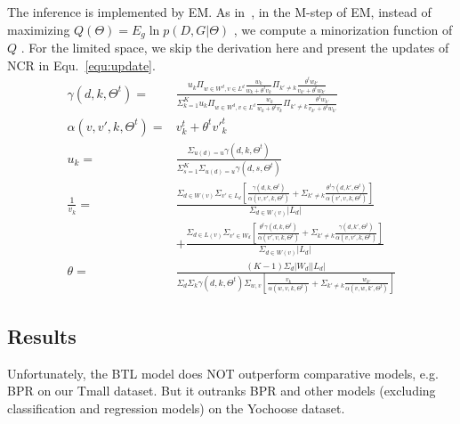 \documentclass[11pt]{report}
\begin{document}
The inference is implemented by EM. As in~\cite{Hunter2004MM}, in the M-step of EM, instead of maximizing $Q(\Theta)=E_g \ln p(D,G|\Theta) $ , we compute a minorization function of $Q$ . For the limited space, we skip the derivation here and present the updates of NCR in Equ.~\ref{equ:update}. 
\begin{align}\label{equ:update}
\gamma(d,k,\Theta^t) =&\frac{u_k \Pi_{w \in W^d, v\in L^d} \frac{w_k}{w_k+\theta^t v_k}\Pi_{k'\neq k}\frac{\theta^t w_{k'}}{v_{k'}+\theta^t w_{k'}}}{\Sigma_{k=1}^K u_k \Pi_{w \in W^d, v\in L^d} \frac{w_k}{w_k+\theta^t v_k}\Pi_{k'\neq k}\frac{\theta^t w_{k'}}{v_{k'}+\theta^t w_{k'}}}\\\nonumber
\alpha(v,v',k,\Theta^t)=&v_k^t + \theta^t {v'}_k^t\\\nonumber
u_k = & \frac{\Sigma_{u(d)=u}\gamma(d,k,\Theta^t)}{\Sigma_{s=1}^K \Sigma_{u(d)=u}\gamma(d,s,\Theta^t)} \\\nonumber
\frac{1}{v_k}= &\frac{\Sigma_{d\in W(v)}\Sigma_{v'\in L_d} [\frac{\gamma(d,k,\Theta^t)}{ \alpha(v,v',k,\Theta^t)} +\Sigma_{k'\neq k}\frac{\theta^t\gamma(d,k',\Theta^t)}{\alpha(v',v,k,\Theta^t)}]}{\Sigma_{d\in W(v)}|L_d|}\\\nonumber
 & + \frac{\Sigma_{d\in L(v)}\Sigma_{v'\in W_d} [\frac{\theta^t \gamma(d,k,\Theta^t)}{\alpha(v',v,k,\Theta^t)}+\Sigma_{k'\neq k} \frac{\gamma(d,k',\Theta^t)}{\alpha(v,v',k,\Theta^t)}] }{\Sigma_{d\in W(v)}|L_d|}\\\nonumber
\theta = & \frac{(K-1)\Sigma_d |W_d| |L_d|}{\Sigma_d \Sigma_k \gamma(d,k,\Theta^t)\Sigma_{w,v} [\frac{v_k}{\alpha(w,v,k,\Theta^t)}+\Sigma_{k'\neq k} \frac{w_{k'}}{\alpha(v,w,k',\Theta^t)}]}
\end{align}

 

\subsection{Results}
Unfortunately, the BTL model does NOT outperform comparative models, e.g. BPR on our Tmall dataset. But it outranks BPR and other models (excluding classification and regression models) on the Yochoose dataset. 
\end{document}
